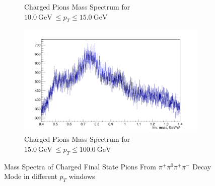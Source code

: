 \begin{figure}[h]
\begin{subfigure}[t]{0.5\linewidth}
\caption{Charged Pions Mass Spectrum for $10.0 \ \mathrm{GeV} \ \leq p_T \leq 15.0 \ \mathrm{GeV}$}
\label{fig:MPtChPio100_150}
\end{subfigure} \hspace{0.1cm}
\begin{subfigure}[t]{.5\linewidth}
\centering
\includegraphics[width=0.98\linewidth]{Figures/ChargedPioSpectra/ChPioMassSpectrum150_1000.png}
\caption{Charged Pions Mass Spectrum for $15.0 \ \mathrm{GeV} \ \leq p_T \leq 100.0 \ \mathrm{GeV}$}
\label{fig:MPtChPio150_1000}
\end{subfigure}
\caption{Mass Spectra of Charged Final State Pions From $\pi^{+} \pi^0\pi^{+}\pi^{-}$ Decay Mode in different $p_T$ windows}
\label{fig:MPtChPio}
\end{figure}